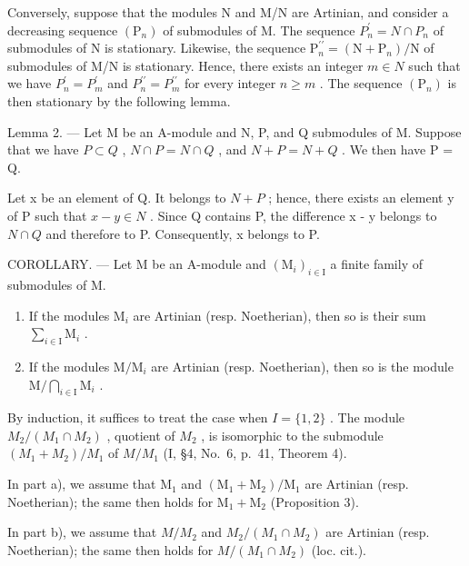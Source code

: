 Conversely, suppose that the modules N and M/N are Artinian, and consider a decreasing sequence \((\mathrm{P}_{n})\) of submodules of M. The sequence \(P_{n}^{\prime} = N \cap P_{n}\) of submodules of N is stationary. Likewise, the sequence \(\mathrm{P}_{n}^{\prime\prime} = (\mathrm{N} + \mathrm{P}_{n})/\mathrm{N}\) of submodules of M/N is stationary. Hence, there exists an integer \(m \in N\) such that we have \(P_{n}^{\prime} = P_{m}^{\prime}\) and \(P_{n}^{\prime\prime} = P_{m}^{\prime\prime}\) for every integer \(n \geqslant m\) . The sequence \((\mathrm{P}_{n})\) is then stationary by the following lemma.

Lemma 2. --- Let M be an A-module and N, P, and Q submodules of M. Suppose that we have \(P \subset Q\) , \(N \cap P = N \cap Q\) , and \(N + P = N + Q\) . We then have P = Q.

Let x be an element of Q. It belongs to \(N + P\) ; hence, there exists an element y of P such that \(x - y \in N\) . Since Q contains P, the difference x - y belongs to \(N \cap Q\) and therefore to P. Consequently, x belongs to P.

COROLLARY. --- Let M be an A-module and \((\mathrm{M}_{i})_{i\in\mathrm{I}}\) a finite family of submodules of M.

\begin{enumerate}
\def\labelenumi{\alph{enumi})}
\item
  If the modules \(\mathrm{M}_i\) are Artinian (resp. Noetherian), then so is their sum \(\sum_{i\in \mathrm{I}}\mathrm{M}_i\) .
\item
  If the modules \(\mathrm{M} / \mathrm{M}_i\) are Artinian (resp. Noetherian), then so is the module \(\mathrm{M} / \bigcap_{i\in \mathrm{I}}\mathrm{M}_i\) .
\end{enumerate}

By induction, it suffices to treat the case when \(I = \{1, 2\}\) . The module \(M_{2}/(M_{1} \cap M_{2})\) , quotient of \(M_{2}\) , is isomorphic to the submodule \((M_{1} + M_{2})/M_{1}\) of \(M/M_{1}\) (I, §4, No.~6, p.~41, Theorem 4).

In part a), we assume that \(\mathrm{M}_1\) and \((\mathrm{M}_1 + \mathrm{M}_2) / \mathrm{M}_1\) are Artinian (resp. Noetherian); the same then holds for \(\mathrm{M}_1 + \mathrm{M}_2\) (Proposition 3).

In part b), we assume that \(M/M_{2}\) and \(M_{2}/(M_{1} \cap M_{2})\) are Artinian (resp. Noetherian); the same then holds for \(M/(M_{1} \cap M_{2})\) (loc. cit.).

